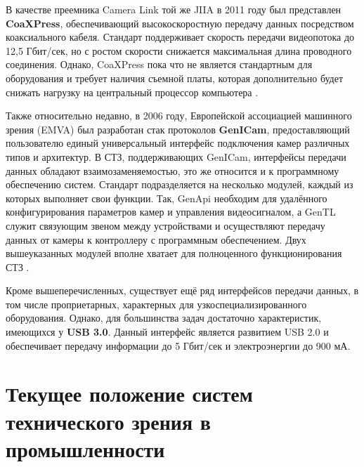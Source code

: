 В качестве преемника Camera Link той же JIIA в 2011 году был представлен \textbf{CoaXPress}, обеспечивающий высокоскоростную передачу данных посредством коаксиального кабеля. Стандарт поддерживает скорость передачи видеопотока до 12,5 Гбит/сек, но с ростом скорости снижается максимальная длина проводного соединения. Однако, CoaXPress пока что не является стандартным для оборудования и требует наличия съемной платы, которая дополнительно будет снижать нагрузку на центральный процессор компьютера \cite{coaxpress}.

Также относительно недавно, в 2006 году, Европейской ассоциацией машинного зрения (EMVA) был разработан стак протоколов \textbf{GenICam}, предоставляющий пользователю единый универсальный интерфейс подключения камер различных типов и архитектур. В СТЗ, поддерживающих GenICam, интерфейсы передачи данных обладают взаимозаменяемостью, это же относится и к программному обеспечению систем. Стандарт подразделяется на несколько модулей, каждый из которых выполняет свои функции. Так, GenApi необходим для удалённого конфигурирования параметров камер и управления видеосигналом, а GenTL служит связующим звеном между устройствами и осуществляют передачу данных от камеры к контроллеру с программным обеспечением. Двух вышеуказанных модулей вполне хватает для полноценного функционирования СТЗ \cite{genicam}.

Кроме вышеперечисленных, существует ещё ряд интерфейсов передачи данных, в том числе проприетарных, характерных для узкоспециализированного оборудования. Однако, для большинства задач достаточно характеристик, имеющихся у \textbf{USB 3.0}. Данный интерфейс является развитием USB 2.0 и обеспечивает передачу информации до 5 Гбит/сек и электроэнергии до 900 мА.

\section{Текущее положение систем технического зрения в промышленности} \label{sect1_2}

